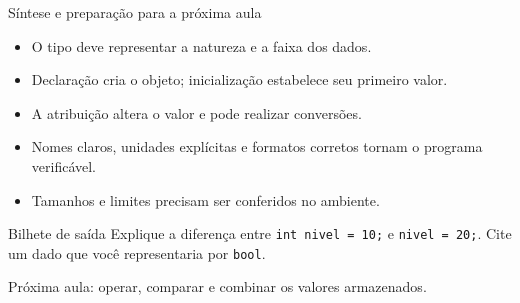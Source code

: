 \begin{frame}{Síntese e preparação para a próxima aula}
\begin{itemize}
\item O tipo deve representar a natureza e a faixa dos dados.
\item Declaração cria o objeto; inicialização estabelece seu primeiro valor.
\item A atribuição altera o valor e pode realizar conversões.
\item Nomes claros, unidades explícitas e formatos corretos tornam o programa verificável.
\item Tamanhos e limites precisam ser conferidos no ambiente.
\end{itemize}
\begin{block}{Bilhete de saída}
Explique a diferença entre \texttt{int nivel = 10;} e \texttt{nivel = 20;}. Cite um dado que você representaria por \texttt{bool}.
\end{block}
Próxima aula: operar, comparar e combinar os valores armazenados.
\end{frame}
